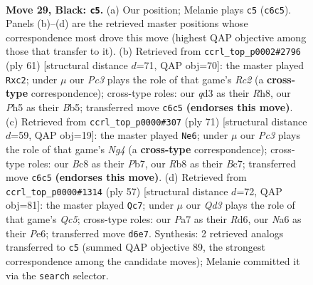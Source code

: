 \documentclass[11pt]{article}
\begin{document}
\clearpage

\begin{figure}[p]\centering
\begin{subfigure}{0.46\textwidth}\centering
\resizebox{\linewidth}{!}{%
\newchessgame
\chessboard[
  setfen={1rb5/pp4k1/n1pq2p1/6pp/3P4/PB1Q1PP1/1P2RK1P/2R5 b - - 5 29},
  showmover=false,
  pgfstyle=straightmove, color=movearrow, markmove={c6-c5}
]}
\caption{}
\end{subfigure}\hfill
\begin{subfigure}{0.46\textwidth}\centering
\resizebox{\linewidth}{!}{%
\newchessgame
\chessboard[
  setfen={1k5r/1pr5/p2q4/1b1P1pQB/4p2P/P3R3/1PP3P1/K2R4 b - - 2 31},
  showmover=false,
  pgfstyle=straightmove, color=movearrow, markmove={c7-c2}
]}
\caption{}
\end{subfigure}
\\[4pt]
\begin{subfigure}{0.46\textwidth}\centering
\resizebox{\linewidth}{!}{%
\newchessgame
\chessboard[
  setfen={3r2k1/1pb2p2/2p3pp/4p1n1/P1P3Pq/4P1NP/1BQ2PK1/7R b - - 0 36},
  showmover=false,
  pgfstyle=straightmove, color=movearrow, markmove={g5-e6}
]}
\caption{}
\end{subfigure}\hfill
\begin{subfigure}{0.46\textwidth}\centering
\resizebox{\linewidth}{!}{%
\newchessgame
\chessboard[
  setfen={6k1/6pp/p2rp1b1/1p2p1P1/2q1P1B1/P4P2/1PP4Q/1K5R b - - 9 29},
  showmover=false,
  pgfstyle=straightmove, color=movearrow, markmove={c4-c7}
]}
\caption{}
\end{subfigure}
\caption{\textbf{Move 29, Black: \texttt{c5}.} (a) Our position; Melanie plays \texttt{c5} (\texttt{c6c5}). Panels (b)--(d) are the retrieved master positions whose correspondence most drove this move (highest QAP objective among those that transfer to it). (b) Retrieved from \texttt{ccrl\_top\_p0002\#2796} (ply 61) [structural distance $d$=71, QAP obj=70]: the master played \texttt{Rxc2}; under $\mu$ our \emph{Pc3} plays the role of that game's \emph{Rc2} (a \textbf{cross-type} correspondence); cross-type roles: our \emph{q}d3 as their \emph{R}h8, our \emph{P}h5 as their \emph{B}b5; transferred move \texttt{c6c5} \textbf{(endorses this move)}. (c) Retrieved from \texttt{ccrl\_top\_p0000\#307} (ply 71) [structural distance $d$=59, QAP obj=19]: the master played \texttt{Ne6}; under $\mu$ our \emph{Pc3} plays the role of that game's \emph{Ng4} (a \textbf{cross-type} correspondence); cross-type roles: our \emph{B}c8 as their \emph{P}b7, our \emph{R}b8 as their \emph{B}c7; transferred move \texttt{c6c5} \textbf{(endorses this move)}. (d) Retrieved from \texttt{ccrl\_top\_p0000\#1314} (ply 57) [structural distance $d$=72, QAP obj=81]: the master played \texttt{Qc7}; under $\mu$ our \emph{Qd3} plays the role of that game's \emph{Qc5}; cross-type roles: our \emph{P}a7 as their \emph{R}d6, our \emph{N}a6 as their \emph{P}e6; transferred move \texttt{d6e7}. Synthesis: 2 retrieved analogs transferred to \texttt{c5} (summed QAP objective 89, the strongest correspondence among the candidate moves); Melanie committed it via the \texttt{search} selector.}
\label{fig:thought-m57}
\end{figure}
\end{document}
